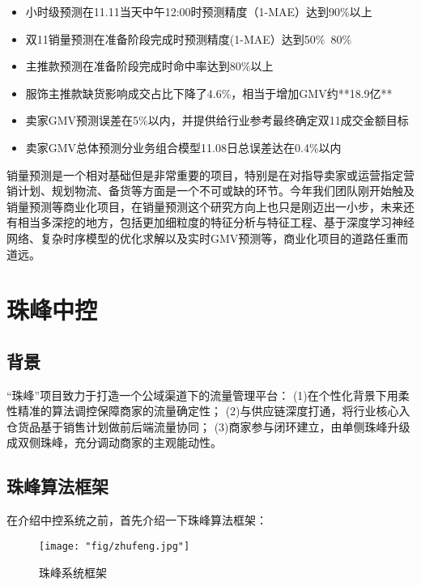 \begin{itemize}
\item 小时级预测在11.11当天中午12:00时预测精度（1-MAE）达到90\%以上
\item 双11销量预测在准备阶段完成时预测精度(1-MAE）达到50\%~80\%
\item 主推款预测在准备阶段完成时命中率达到80\%以上
\item 服饰主推款缺货影响成交占比下降了4.6\%，相当于增加GMV约**18.9亿**
\item 卖家GMV预测误差在5\%以内，并提供给行业参考最终确定双11成交金额目标
\item 卖家GMV总体预测分业务组合模型11.08日总误差达在0.4\%以内
\end{itemize}

销量预测是一个相对基础但是非常重要的项目，特别是在对指导卖家或运营指定营销计划、规划物流、备货等方面是一个不可或缺的环节。今年我们团队刚开始触及销量预测等商业化项目，在销量预测这个研究方向上也只是刚迈出一小步，未来还有相当多深挖的地方，包括更加细粒度的特征分析与特征工程、基于深度学习神经网络、复杂时序模型的优化求解以及实时GMV预测等，商业化项目的道路任重而道远。

\section{珠峰中控}

\subsection{背景}

“珠峰”项目致力于打造一个公域渠道下的流量管理平台：
(1)在个性化背景下用柔性精准的算法调控保障商家的流量确定性；
(2)与供应链深度打通，将行业核心入仓货品基于销售计划做前后端流量协同；
(3)商家参与闭环建立，由单侧珠峰升级成双侧珠峰，充分调动商家的主观能动性。

\subsection{珠峰算法框架}
在介绍中控系统之前，首先介绍一下珠峰算法框架：

\begin{figure}[!h]
	\centering
	\texttt{[image: "fig/zhufeng.jpg"]}
	\caption{珠峰系统框架}
	\label{fig:zhufeng}
\end{figure}

